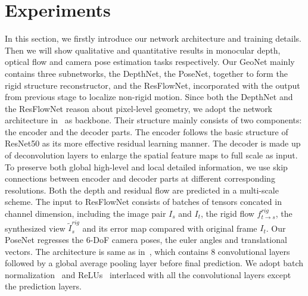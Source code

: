 \documentclass[10pt,twocolumn,letterpaper]{article}
\begin{document}
\section{Experiments}
\label{sec:exper}
In this section, we firstly introduce our network architecture and training details. Then we will show qualitative and quantitative results in monocular depth, optical flow and camera pose estimation tasks respectively. %
Our GeoNet mainly contains three subnetworks, the DepthNet, the PoseNet, together to form the rigid structure reconstructor, and the ResFlowNet, incorporated with the output from previous stage to localize non-rigid motion. 
Since both the DepthNet and the ResFlowNet reason about pixel-level geometry, we adopt the network architecture in~\cite{monodepth17} as backbone.  
Their structure mainly consists of two components: the encoder and the decoder parts. The encoder follows the basic structure of ResNet50
 as its more effective residual learning manner. The decoder is made up of deconvolution layers to enlarge the spatial feature maps to full scale as input. To preserve both global high-level and local detailed information, we use skip connections between encoder and decoder parts at different corresponding resolutions. %
Both the depth and residual flow are predicted in a multi-scale scheme. %
The input to ResFlowNet consists of batches of tensors concated in channel dimension, including the image pair $I_s$ and $I_t$, the rigid flow $f_{t\to s}^{rig}$, the synthesized view $\tilde{I}_s^{rig}$ and its error map compared with original frame $I_t$.
Our PoseNet regresses the  6-DoF camera poses, \ie the euler angles and translational vectors. The architecture is same as in~\cite{zhou2017unsupervised}, which contains 8 convolutional layers followed by a global average pooling layer before final prediction. We adopt batch normalization~\cite{ioffe2015batch} and ReLUs~\cite{nair2010rectified} interlaced with all the convolutional layers except the prediction layers.
\end{document}
